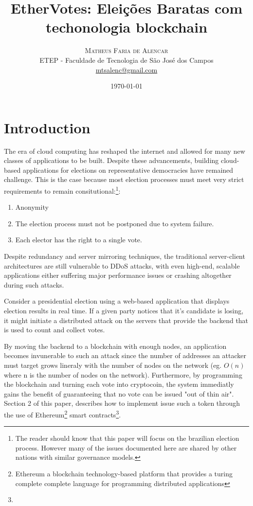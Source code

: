 \documentclass[twoside]{article}
\title{EtherVotes: Eleições Baratas com techonologia blockchain} %
\author{%
\textsc{Matheus Faria de Alencar} \\[1ex] %
\normalsize ETEP - Faculdade de Tecnologia de S\~ao Jos\'e dos Campos \\ %
\normalsize \href{mailto:mtsalenc@gmail.com}{mtsalenc@gmail.com} %
}
\date{\today} %
\begin{document}
\maketitle


\section{Introduction}

The era of cloud computing has reshaped the internet and allowed for many new classes of applications to be built. Despite these advancements, building cloud-based applications for elections on representative democracies have remained challenge. This is the case because most election processes must meet very strict requirements to remain consitutional:\footnote{The reader should know that this paper will focus on the brazilian election process. However many of the issues documented here are shared by other nations with similar governance models.}:
\begin{enumerate}
\item Anonymity
\item The election process must not be postponed due to system failure.
\item Each elector has the right to a single vote.
\end{enumerate}

Despite redundancy and server mirroring techniques, the traditional server-client architectures are still vulnerable to DDoS attacks, with even high-end, scalable applications either suffering major performance issues or crashing altogether during such attacks.

Consider a presidential election using a web-based application that displays election results in real time. If a given party notices that it's candidate is losing, it might initiate a distributed attack on the servers that provide the backend that is used to count and collect votes. 

By moving the backend to a blockchain with enough nodes, an application becomes invunerable to such an attack since the number of addresses an attacker must target grows lineraly with the number of nodes on the network (eg. $O(n)$ where n is the number of nodes on the network). Furthermore, by  programming the blockchain and turning each vote into cryptocoin, the system immediatly gains the benefit of guaranteeing that no vote can be issued "out of thin air". Section 2 of this paper, describes how to implement issue such a token through the use of Ethereum\footnote{Ethereum a blockchain technology-based platform that provides a turing complete complete language for programming distributed applications} smart contracts\footnote{}.
\end{document}
